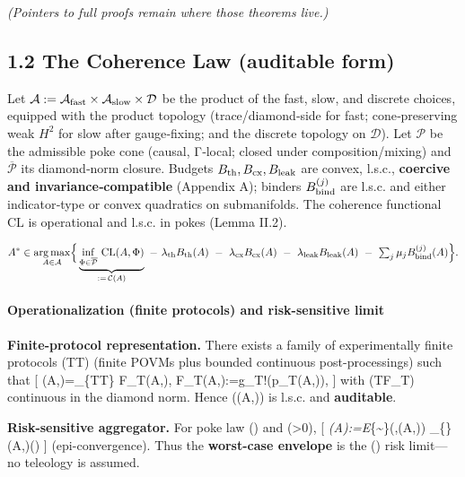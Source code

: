 \documentclass[
]{article}
\numberwithin{equation}{section}
\begin{document}
\emph{(Pointers to full proofs remain where those theorems live.)}

\hypertarget{the-coherence-law-auditable-form}{%
\subsection{1.2 The Coherence Law (auditable
form)}\label{the-coherence-law-auditable-form}}

Let
\(\mathcal A:= \mathcal A_{\rm fast}\times\mathcal A_{\rm slow}\times \mathcal D\)
be the product of the fast, slow, and discrete choices, equipped with
the product topology (trace/diamond‑side for fast; cone‑preserving weak
\(H^2\) for slow after gauge‑fixing; and the discrete topology on
\(\mathcal D\)). Let \(\mathcal P\) be the admissible poke cone (causal,
Γ‑local; closed under composition/mixing) and \(\overline{\mathcal P}\)
its diamond‑norm closure. Budgets \(B_{\rm th},B_{\rm cx},B_{\rm leak}\)
are convex, l.s.c., \textbf{coercive and invariance‑compatible}
(Appendix A); binders \(B_{\rm bind}^{(j)}\) are l.s.c. and either
indicator‑type or convex quadratics on submanifolds. The coherence
functional \(\mathrm{CL}\) is operational and l.s.c. in pokes (Lemma
II.2).

\[
A^* \in \underset{A\in\mathcal A}{\arg\max}\Big\{\underbrace{\inf_{\Phi\in\overline{\mathcal P}} \,\mathrm{CL}(A,\Phi)}_{:=\,\mathcal C(A)}\ -\ \lambda_{\rm th} B_{\rm th}(A)\ -\ \lambda_{\rm cx} B_{\rm cx}(A)\ -\ \lambda_{\rm leak} B_{\rm leak}(A)\ -\ \textstyle\sum_j \mu_j B_{\rm bind}^{(j)}(A)\Big\}.
\]

\hypertarget{operationalization-finite-protocols-and-risk-sensitive-limit}{%
\paragraph{Operationalization (finite protocols) and risk-sensitive
limit}\label{operationalization-finite-protocols-and-risk-sensitive-limit}}

\textbf{Finite-protocol representation.} There exists a family of
experimentally finite protocols (T\in\mathscr T) (finite POVMs plus
bounded continuous post-processings) such that {[}
(A,\Phi)=\sup\_\{T\in\mathscr T\} F\_T(A,\Phi),\qquad
F\_T(A,\Phi):=g\_T!\big(p\_T(A,\Phi)\big), {]} with (T\mapsto F\_T)
continuous in the diamond norm. Hence (\Phi\mapsto {}(A,\Phi))
is l.s.c. and \textbf{auditable}.

\textbf{Risk-sensitive aggregator.} For poke law (\Pi) and
(\beta\textgreater0), {[}
\emph{\beta(A):=\log\mathbb E}\{\Phi\sim\Pi\}\exp\big(\beta,(A,\Phi)\big)
\searrow \inf\_\{\Phi\in{}\}(A,\Phi)\quad(\beta\to\infty)
{]} (epi-convergence). Thus the \textbf{worst-case envelope} is the
(\beta\to\infty) risk limit---no teleology is assumed.
\end{document}
